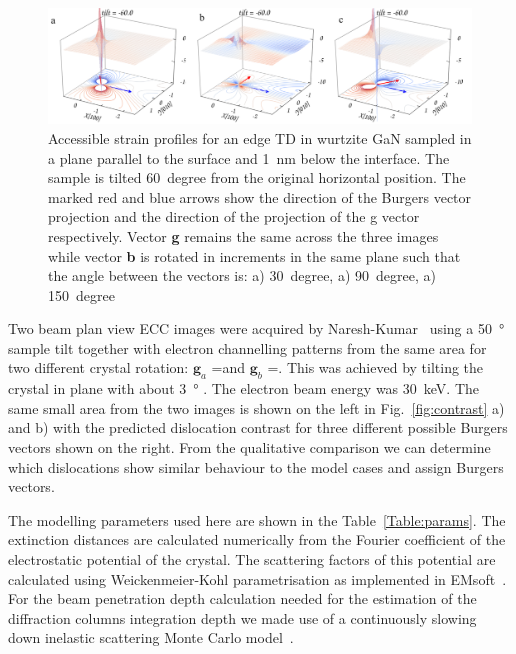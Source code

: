 \begin{figure}
    \centering
    \includegraphics[width=1.1\linewidth]{Figures/rotateEdge.png}
    \caption[Edge TD ECC-strain in different orientations.]{Accessible strain profiles for an edge TD in wurtzite GaN sampled in a plane parallel  to the surface and \SI{1}{\nano \meter} below the interface. The sample is tilted  \SI{60}{degree} from the original horizontal position. The marked red and blue arrows show the direction of the Burgers vector projection and the direction of the projection of the g vector respectively. Vector\textbf{ g} remains the same across the three images while vector \textbf{b} is rotated in  increments in the same plane such that the angle between the vectors is: a) \SI{30}{degree}, a) \SI{90}{degree}, a) \SI{150}{degree} }
    \label{fig:rotateEdge}
\end{figure}



Two beam plan view ECC images were acquired by Naresh-Kumar~\cite{Naresh} using a \SI{50}{\degree}       sample tilt together with electron channelling patterns from the same area for two different crystal rotation: $\mathbf{g}_a$ =\hkl[-5-7-3] and $\mathbf{g}_b$ =\hkl[75-3]. This was achieved by tilting the crystal in plane with about \SI{3}{\degree} . The electron beam energy was \SI{30}{\kilo \electronvolt}. The same small area from the two images is shown on the left in Fig.~\ref{fig:contrast} a) and b) with the predicted dislocation contrast for three different possible Burgers vectors shown on the right. From the qualitative comparison we can determine which dislocations show similar behaviour to the model cases and assign Burgers vectors.

The modelling parameters used here are shown in the Table~\ref{Table:params}. The extinction distances are calculated numerically from the Fourier coefficient of the electrostatic potential of the crystal. The scattering factors of this potential are calculated using Weickenmeier-Kohl parametrisation as implemented in EMsoft~\cite{EMsoft}. For the beam penetration depth calculation needed for the estimation of the diffraction columns integration depth we made use of a continuously slowing down inelastic scattering Monte Carlo model~\cite{casino}. 






